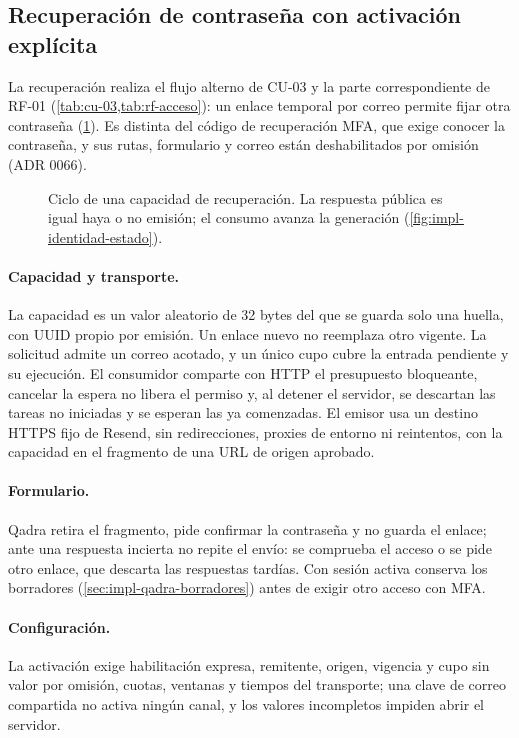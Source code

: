 \subsection{Recuperación de contraseña con activación explícita}\label{sec:impl-recuperacion-password}

La recuperación realiza el flujo alterno de CU-03 y la parte correspondiente de RF-01 (\cref{tab:cu-03,tab:rf-acceso}): un enlace temporal por correo permite fijar otra contraseña (\cref{fig:impl-recuperacion-estados}). Es distinta del código de recuperación MFA, que exige conocer la contraseña, y sus rutas, formulario y correo están deshabilitados por omisión (ADR 0066).

\begin{figure}[!htb]
  \centering
  
  \caption{Ciclo de una capacidad de recuperación. La respuesta pública es igual haya o no emisión; el consumo avanza la generación (\cref{fig:impl-identidad-estado}).}
  \label{fig:impl-recuperacion-estados}
\end{figure}

\paragraph{Capacidad y transporte.} La capacidad es un valor aleatorio de 32 bytes del que se guarda solo una huella, con UUID propio por emisión. Un enlace nuevo no reemplaza otro vigente. La solicitud admite un correo acotado, y un único cupo cubre la entrada pendiente y su ejecución. El consumidor comparte con HTTP el presupuesto bloqueante, cancelar la espera no libera el permiso y, al detener el servidor, se descartan las tareas no iniciadas y se esperan las ya comenzadas. El emisor usa un destino HTTPS fijo de Resend, sin redirecciones, proxies de entorno ni reintentos, con la capacidad en el fragmento de una URL de origen aprobado.

\paragraph{Formulario.} Qadra retira el fragmento, pide confirmar la contraseña y no guarda el enlace; ante una respuesta incierta no repite el envío: se comprueba el acceso o se pide otro enlace, que descarta las respuestas tardías. Con sesión activa conserva los borradores (\cref{sec:impl-qadra-borradores}) antes de exigir otro acceso con MFA.

\paragraph{Configuración.} La activación exige habilitación expresa, remitente, origen, vigencia y cupo sin valor por omisión, cuotas, ventanas y tiempos del transporte; una clave de correo compartida no activa ningún canal, y los valores incompletos impiden abrir el servidor.

